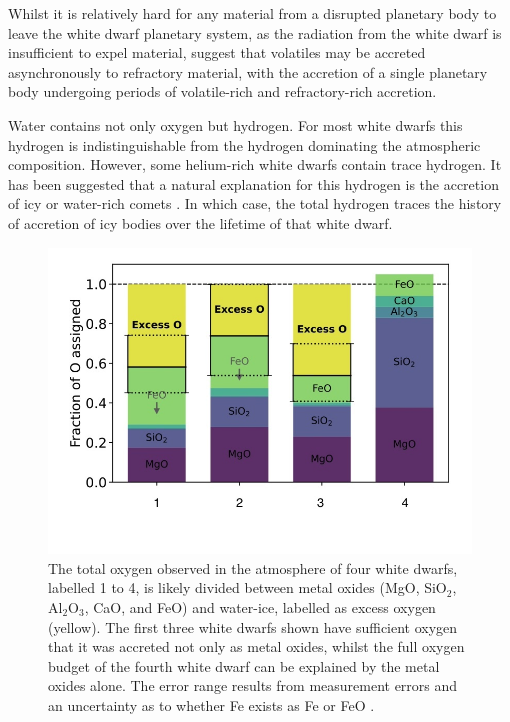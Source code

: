 \documentclass[onecolumn,authoryear]{els-mrw}
\begin{document}
Whilst it is relatively hard for any material from a disrupted planetary body to leave the white dwarf planetary system, as the radiation from the white dwarf is insufficient to expel material, \cite{Brouwers2023_async_volatiles} suggest that volatiles may be accreted asynchronously to refractory material, with the accretion of a single planetary body undergoing periods of volatile-rich and refractory-rich accretion. 


Water contains not only oxygen but hydrogen. For most white dwarfs this hydrogen is indistinguishable from the hydrogen dominating the atmospheric composition. However, some helium-rich white dwarfs contain trace hydrogen. It has been suggested that a natural explanation for this hydrogen is the accretion of icy or water-rich comets \citep{GentileFusillo2017}. In which case, the total hydrogen traces the history of accretion of icy bodies over the lifetime of that white dwarf. 






\begin{figure}
    \centering
    \includegraphics[width=.5\textwidth]{rogers_oexcess.jpg}
    \caption{The total oxygen observed in the atmosphere of four white dwarfs, labelled 1 to 4, is likely divided between metal oxides (MgO, SiO$_2$, Al$_2$O$_3$, CaO, and FeO) and water-ice, labelled as excess oxygen (yellow). The first three white dwarfs shown have sufficient oxygen that it was accreted not only as metal oxides, whilst the full oxygen budget of the fourth white dwarf can be explained by the metal oxides alone. The error range results from measurement errors and an uncertainty as to whether Fe exists as Fe or FeO \citep{Rogers2024b}.  }
    \label{fig:oxygen_excess}
\end{figure}





\end{document}
